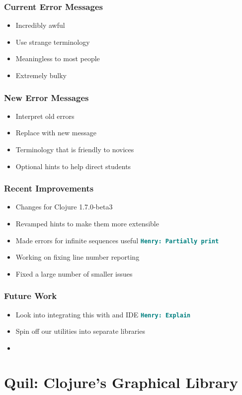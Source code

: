 \documentclass{beamer}
\newcommand{\comment}[1]{{\bf \tt  {#1}}}
\newcommand{\hfcomment}[1]{\textcolor{Teal}{\comment{Henry: {#1}}}}
\begin{document}
\begin{frame}
	\frametitle{Current Error Messages}
	\begin{itemize}
		\item Incredibly awful
		\item Use strange terminology
		\item Meaningless to most people
		\item Extremely bulky
	\end{itemize}
\end{frame}

\begin{frame}
	\frametitle{New Error Messages}
	\begin{itemize}
		\item Interpret old errors
		\item Replace with new message
		\item Terminology that is friendly to novices
		\item Optional hints to help direct students
	\end{itemize}
\end{frame}

\begin{frame}
	\frametitle{Recent Improvements}
	\begin{itemize}
		\item Changes for Clojure 1.7.0-beta3
		\item Revamped hints to make them more extensible
		\item Made errors for infinite sequences useful \hfcomment{Partially print}
		\item Working on fixing line number reporting
		\item Fixed a large number of smaller issues
	\end{itemize}
\end{frame}

\begin{frame}
	\frametitle{Future Work}
	\begin{itemize}
		\item Look into integrating this with and IDE \hfcomment{Explain}
		\item Spin off our utilities into separate libraries
		\item 
	\end{itemize}
\end{frame}




\section{Quil: Clojure's Graphical Library}
\end{document}
